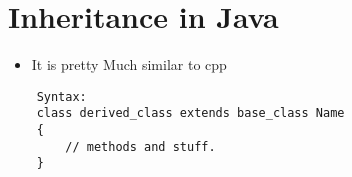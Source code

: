\documentclass[11pt]{article}
\begin{document}


\section{Inheritance in Java}
\begin{itemize}
	\item It is pretty Much similar to cpp
\end{itemize}

\begin{verbatim}
	Syntax: 
	class derived_class extends base_class Name
	{
		// methods and stuff. 
	}
\end{verbatim}
\end{document}
